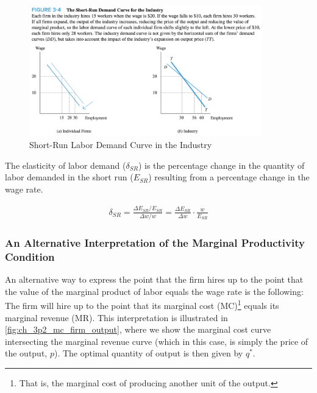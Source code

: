 \begin{figure}[!htb]
    \centering
        \includegraphics[width=0.9\textwidth]{../input/ch_3p2_short_run_industry_demand.png}
    \caption{Short-Run Labor Demand Curve in the Industry}
    \label{fig:ch_3p2_short_run_industry_demand}
\end{figure}

\FloatBarrier

\begin{definition}

    The elasticity of labor demand ($\delta_{SR}$)
    is the percentage change in the quantity of labor demanded in the 
    short run ($E_{SR}$)
    resulting from a percentage change in the wage rate.
    
    \begin{align}
        \delta_{S R}=\frac{\Delta E_{S R} / E_{S R}}{\Delta w / w}=\frac{\Delta E_{S R}}{\Delta w} \cdot \frac{w}{E_{S R}}
    \end{align}
    
\end{definition}

\subsubsection{An Alternative Interpretation of the Marginal Productivity Condition}

An alternative way to express the point that the 
firm hires up to the point that the 
value of the marginal product of labor equals the wage rate is the following: 
The firm will hire up to the point that its marginal 
cost (MC)\footnote{That is, the marginal cost of 
producing another unit of the output.} equals its marginal revenue (MR).
This interpretation is illustrated in 
\autoref{fig:ch_3p2_mc_firm_output}, where 
we show the marginal cost curve intersecting 
the marginal revenue curve (which in this case, 
is simply the price of the output, $p$).
The optimal quantity of output is then 
given by $q^*$.

